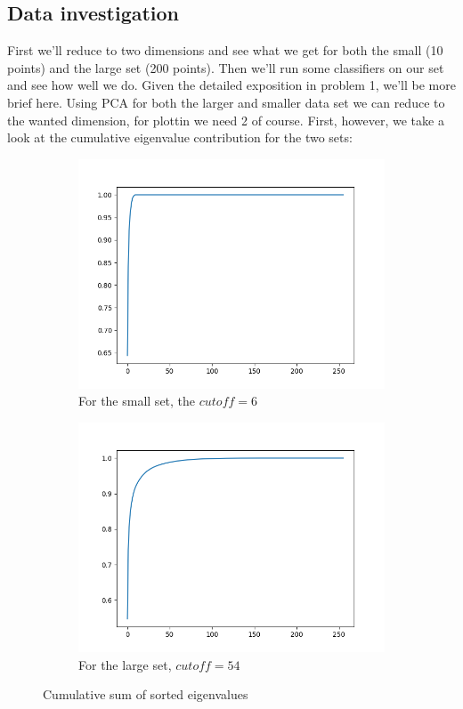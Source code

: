\documentclass[12pt, a4paper]{article}
\begin{document}
\subsection{Data investigation}
First we'll reduce to two dimensions and see what we get for both the small (10 points) and the large set (200 points). Then we'll run some classifiers on our set and see how well we do. Given the detailed exposition in problem 1, we'll be more brief here. Using PCA for both the larger and smaller data set we can reduce to the wanted dimension, for plottin we need 2 of course. First, however, we take a look at the cumulative eigenvalue contribution for the two sets:

\begin{figure}[H]
    \centering
    \begin{subfigure}{0.45\textwidth}
        \includegraphics[width=\textwidth]{recursos/3/cumsum_eigen_pca}
        \caption{ For the small set, the $cutoff=6$ }
    \end{subfigure}
    \begin{subfigure}{0.45\textwidth}
        \includegraphics[width=\textwidth]{recursos/3/cumsum_eigen_pca_larger}
        \caption{ For the large set, $cutoff=54$}
    \end{subfigure}
     \caption{Cumulative sum of sorted eigenvalues}
\end{figure}
\end{document}
